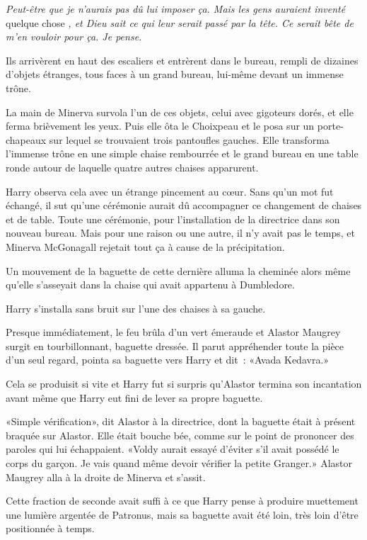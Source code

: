 \emph{Peut-être que je n'aurais pas dû lui imposer ça. Mais les gens auraient inventé} quelque chose \emph{, et Dieu sait ce qui leur serait passé par la tête. Ce serait bête de m'en vouloir pour ça. Je pense.}

Ils arrivèrent en haut des escaliers et entrèrent dans le bureau, rempli de dizaines d'objets étranges, tous faces à un grand bureau, lui-même devant un immense trône.

La main de Minerva survola l'un de ces objets, celui avec gigoteurs dorés, et elle ferma brièvement les yeux. Puis elle ôta le Choixpeau et le posa sur un porte-chapeaux sur lequel se trouvaient trois pantoufles gauches. Elle transforma l'immense trône en une simple chaise rembourrée et le grand bureau en une table ronde autour de laquelle quatre autres chaises apparurent.

Harry observa cela avec un étrange pincement au cœur. Sans qu'un mot fut échangé, il sut qu'une cérémonie aurait dû accompagner ce changement de chaises et de table. Toute une cérémonie, pour l'installation de la directrice dans son nouveau bureau. Mais pour une raison ou une autre, il n'y avait pas le temps, et Minerva McGonagall rejetait tout ça à cause de la précipitation.

Un mouvement de la baguette de cette dernière alluma la cheminée alors même qu'elle s'asseyait dans la chaise qui avait appartenu à Dumbledore.

Harry s'installa sans bruit sur l'une des chaises à sa gauche.

Presque immédiatement, le feu brûla d'un vert émeraude et Alastor Maugrey surgit en tourbillonnant, baguette dressée. Il parut appréhender toute la pièce d'un seul regard, pointa sa baguette vers Harry et dit~: «Avada Kedavra.»

Cela se produisit si vite et Harry fut si surpris qu'Alastor termina son incantation avant même que Harry eut fini de lever sa propre baguette.

«Simple vérification», dit Alastor à la directrice, dont la baguette était à présent braquée sur Alastor. Elle était bouche bée, comme sur le point de prononcer des paroles qui lui échappaient. «Voldy aurait essayé d'éviter s'il avait possédé le corps du garçon. Je vais quand même devoir vérifier la petite Granger.» Alastor Maugrey alla à la droite de Minerva et s'assit.

Cette fraction de seconde avait suffi à ce que Harry pense à produire muettement une lumière argentée de Patronus, mais sa baguette avait été loin, très loin d'être positionnée à temps.

